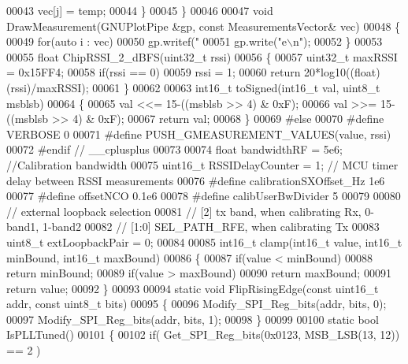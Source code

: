 \begin{DoxyCode}
00043                 vec[j] = temp;
00044             \}
00045 \}
00046 
00047 \textcolor{keywordtype}{void} DrawMeasurement(GNUPlotPipe &gp, \textcolor{keyword}{const} MeasurementsVector& vec)
00048 \{
00049     \textcolor{keywordflow}{for}(\textcolor{keyword}{auto} i : vec)
00050         gp.writef(\textcolor{stringliteral}{"%
00051     gp.write(\textcolor{stringliteral}{"e\(\backslash\)n"});
00052 \}
00053 
00055 \textcolor{keywordtype}{float} ChipRSSI\_2\_dBFS(uint32\_t rssi)
00056 \{
00057     uint32\_t maxRSSI = 0x15FF4;
00058     \textcolor{keywordflow}{if}(rssi == 0)
00059         rssi = 1;
00060     \textcolor{keywordflow}{return} 20*log10((\textcolor{keywordtype}{float})(rssi)/maxRSSI);
00061 \}
00062 
00063 int16\_t toSigned(int16\_t val, uint8\_t msblsb)
00064 \{
00065     val <<= 15-((msblsb >> 4) & 0xF);
00066     val >>= 15-((msblsb >> 4) & 0xF);
00067     \textcolor{keywordflow}{return} val;
00068 \}
00069 \textcolor{preprocessor}{#else}
00070 \textcolor{preprocessor}{#define VERBOSE 0}
00071 \textcolor{preprocessor}{#define PUSH\_GMEASUREMENT\_VALUES(value, rssi)}
00072 \textcolor{preprocessor}{#endif // \_\_cplusplus}
00073 
00074 \textcolor{keywordtype}{float} bandwidthRF = 5e6; \textcolor{comment}{//Calibration bandwidth}
00075 uint16\_t RSSIDelayCounter = 1; \textcolor{comment}{// MCU timer delay between RSSI measurements}
00076 \textcolor{preprocessor}{#define calibrationSXOffset\_Hz 1e6}
00077 \textcolor{preprocessor}{#define offsetNCO 0.1e6}
00078 \textcolor{preprocessor}{#define calibUserBwDivider 5}
00079 
00080 \textcolor{comment}{// external loopback selection}
00081 \textcolor{comment}{// [2] tx band, when calibrating Rx, 0-band1, 1-band2}
00082 \textcolor{comment}{// [1:0] SEL\_PATH\_RFE, when calibrating Tx}
00083 uint8\_t extLoopbackPair = 0;
00084 
00085 int16\_t clamp(int16\_t value, int16\_t minBound, int16\_t maxBound)
00086 \{
00087     \textcolor{keywordflow}{if}(value < minBound)
00088         \textcolor{keywordflow}{return} minBound;
00089     \textcolor{keywordflow}{if}(value > maxBound)
00090         \textcolor{keywordflow}{return} maxBound;
00091     \textcolor{keywordflow}{return} value;
00092 \}
00093 
00094 \textcolor{keyword}{static} \textcolor{keywordtype}{void} FlipRisingEdge(\textcolor{keyword}{const} uint16\_t addr, \textcolor{keyword}{const} uint8\_t bits)
00095 \{
00096     Modify_SPI_Reg_bits(addr, bits, 0);
00097     Modify_SPI_Reg_bits(addr, bits, 1);
00098 \}
00099 
00100 \textcolor{keyword}{static} \textcolor{keywordtype}{bool} IsPLLTuned()
00101 \{
00102     \textcolor{keywordflow}{if}( Get_SPI_Reg_bits(0x0123, MSB_LSB(13, 12)) == 2 )
}
\end{DoxyCode}
